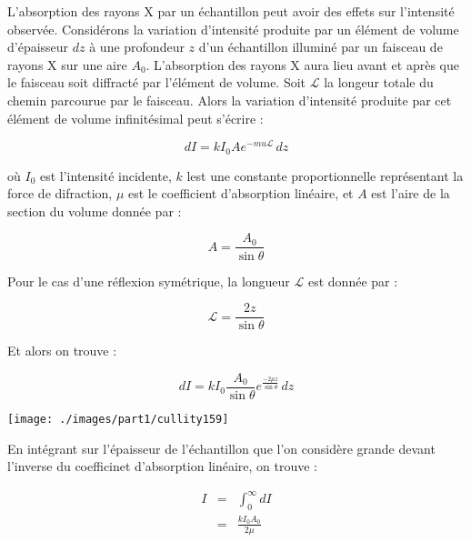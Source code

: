L'absorption des rayons X par un échantillon peut avoir des effets sur l'intensité observée. Considérons la variation d'intensité produite par un élément de volume d'épaisseur $dz$ à une profondeur $z$ d'un échantillon illuminé par un faisceau de rayons X sur une aire $A_0$. L'absorption des rayons X aura lieu avant et après que le faisceau soit diffracté par l'élément de volume.
Soit $\mathcal{L}$ la longeur totale du chemin parcourue par le faisceau. Alors la variation d'intensité produite par cet élément de volume infinitésimal peut s'écrire :

\begin{equation}
    dI = kI_0 A e^{-mu \mathcal{L}}\,dz
\end{equation}

où $I_0$ est l'intensité incidente, $k$ lest une constante proportionnelle représentant la force de difraction, $\mu$ est le coefficient d'absorption linéaire, et $A$ est l'aire de la section du volume donnée par :

\begin{equation}
    A = \frac{A_0}{\sin \theta}
\end{equation}

Pour le cas d'une réflexion symétrique, la longueur $\mathcal{L}$ est donnée par :

\begin{equation}
    \mathcal{L} = \frac{2z}{\sin \theta}
\end{equation}

Et alors on trouve :

\begin{equation}
    dI = k I_0 \frac{A_0}{\sin \theta} e^{\frac{-2\mu z}{\sin \theta}}\, dz
\end{equation}

\begin{marginfigure}
    \texttt{[image: ./images/part1/cullity159]}
    \caption{Schéma représentant la diffraction d'un écanillon plat, avec un faisceau ayant une largeur de \SI{1}{\centi\metre} dans la direction normale au plan du dessin}
    \label{fig:facteurabs}
\end{marginfigure}

En intégrant sur l'épaisseur de l'échantillon que l'on considère grande devant l'inverse du coefficinet d'absorption linéaire, on trouve :

\begin{eqnarray}
    I & = & \int_0^\infty dI\\
    & = & \frac{k I_0A_0}{2 \mu}
\end{eqnarray}

